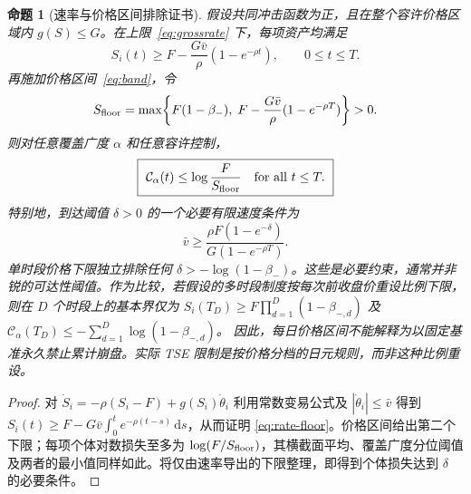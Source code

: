 \documentclass[11pt]{article}
\numberwithin{equation}{section}
\newtheorem{proposition}[theorem]{命题}
\theoremstyle{definition}
\theoremstyle{remark}
\newcommand{\dd}{\,\mathrm{d}}
\begin{document}
\begin{proposition}[速率与价格区间排除证书]\label{prop:rate-band}
假设共同冲击函数为正，且在整个容许价格区域内 $g(S)\le G$。在上限~\eqref{eq:grossrate} 下，每项资产均满足
\begin{equation}\label{eq:rate-floor}
 S_i(t)\ge F-\frac{G\bar v}{\rho}(1-e^{-\rho t}),\qquad 0\le t\le T.
\end{equation}
再施加价格区间~\eqref{eq:band}，令
\begin{equation}\label{eq:twofloors}
 S_{\rm floor}=\max\!\left\{F(1-\beta_-),\;F-\frac{G\bar v}{\rho}(1-e^{-\rho T})\right\}>0.
\end{equation}
则对任意覆盖广度 $\alpha$ 和任意容许控制，
\begin{equation}\label{eq:constrained-crisis}
\boxed{\ \mathcal C_\alpha(t)\le \log\frac{F}{S_{\rm floor}}\quad\hbox{for all }t\le T.\ }
\end{equation}
特别地，到达阈值 $\delta>0$ 的一个必要有限速度条件为
\begin{equation}\label{eq:min-speed}
\boxed{\ \bar v\ge\frac{\rho F(1-e^{-\delta})}{G(1-e^{-\rho T})}.\ }
\end{equation}
单时段价格下限独立排除任何 $\delta> -\log(1-\beta_-)$。这些是\emph{必要}约束，通常并非锐的可达性阈值。作为比较，若\emph{假设的}多时段制度按每次前收盘价重设比例下限，则在 $D$ 个时段上的基本界仅为
$S_i(T_D)\ge F\prod_{d=1}^D(1-\beta_{-,d})$ 及
$\mathcal C_\alpha(T_D)\le-\sum_{d=1}^D\log(1-\beta_{-,d})$。
因此，每日价格区间不能解释为以固定基准永久禁止累计崩盘。实际 TSE 限制是按价格分档的日元规则，而非这种比例重设。
\end{proposition}
\begin{proof}
对 $\dot S_i=-\rho(S_i-F)+g(S_i)\dot\theta_i$ 利用常数变易公式及 $|\dot\theta_i|\le\bar v$ 得到 $S_i(t)\ge F-G\bar v\int_0^t e^{-\rho(t-s)}\dd s$，从而证明 \eqref{eq:rate-floor}。价格区间给出第二个下限；每项个体对数损失至多为 $\log(F/S_{\rm floor})$，其横截面平均、覆盖广度分位阈值及两者的最小值同样如此。将仅由速率导出的下限整理，即得到个体损失达到 $\delta$ 的必要条件。
\end{proof}
\end{document}
